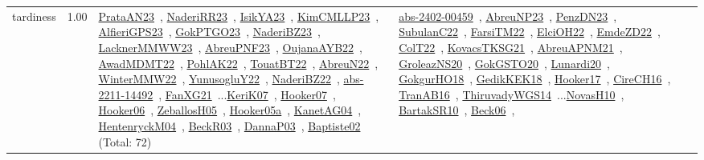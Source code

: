 {\begin{longtable}{p{3cm}r>{\raggedright\arraybackslash}p{6cm}>{\raggedright\arraybackslash}p{6cm}>{\raggedright\arraybackslash}p{8cm}}
\index{tardiness}\index{Concepts!tardiness}tardiness &  1.00 & \href{../works/PrataAN23.pdf}{PrataAN23}~\cite{PrataAN23}, \href{../works/NaderiRR23.pdf}{NaderiRR23}~\cite{NaderiRR23}, \href{../works/IsikYA23.pdf}{IsikYA23}~\cite{IsikYA23}, \href{../works/KimCMLLP23.pdf}{KimCMLLP23}~\cite{KimCMLLP23}, \href{../works/AlfieriGPS23.pdf}{AlfieriGPS23}~\cite{AlfieriGPS23}, \href{../works/GokPTGO23.pdf}{GokPTGO23}~\cite{GokPTGO23}, \href{../works/NaderiBZ23.pdf}{NaderiBZ23}~\cite{NaderiBZ23}, \href{../works/LacknerMMWW23.pdf}{LacknerMMWW23}~\cite{LacknerMMWW23}, \href{../works/AbreuPNF23.pdf}{AbreuPNF23}~\cite{AbreuPNF23}, \href{../works/OujanaAYB22.pdf}{OujanaAYB22}~\cite{OujanaAYB22}, \href{../works/AwadMDMT22.pdf}{AwadMDMT22}~\cite{AwadMDMT22}, \href{../works/PohlAK22.pdf}{PohlAK22}~\cite{PohlAK22}, \href{../works/TouatBT22.pdf}{TouatBT22}~\cite{TouatBT22}, \href{../works/AbreuN22.pdf}{AbreuN22}~\cite{AbreuN22}, \href{../works/WinterMMW22.pdf}{WinterMMW22}~\cite{WinterMMW22}, \href{../works/YunusogluY22.pdf}{YunusogluY22}~\cite{YunusogluY22}, \href{../works/NaderiBZ22.pdf}{NaderiBZ22}~\cite{NaderiBZ22}, \href{../works/abs-2211-14492.pdf}{abs-2211-14492}~\cite{abs-2211-14492}, \href{../works/FanXG21.pdf}{FanXG21}~\cite{FanXG21}...\href{../works/KeriK07.pdf}{KeriK07}~\cite{KeriK07}, \href{../works/Hooker07.pdf}{Hooker07}~\cite{Hooker07}, \href{../works/Hooker06.pdf}{Hooker06}~\cite{Hooker06}, \href{../works/ZeballosH05.pdf}{ZeballosH05}~\cite{ZeballosH05}, \href{../works/Hooker05a.pdf}{Hooker05a}~\cite{Hooker05a}, \href{../works/KanetAG04.pdf}{KanetAG04}~\cite{KanetAG04}, \href{../works/HentenryckM04.pdf}{HentenryckM04}~\cite{HentenryckM04}, \href{../works/BeckR03.pdf}{BeckR03}~\cite{BeckR03}, \href{../works/DannaP03.pdf}{DannaP03}~\cite{DannaP03}, \href{../works/Baptiste02.pdf}{Baptiste02}~\cite{Baptiste02} (Total: 72) & \href{../works/abs-2402-00459.pdf}{abs-2402-00459}~\cite{abs-2402-00459}, \href{../works/AbreuNP23.pdf}{AbreuNP23}~\cite{AbreuNP23}, \href{../works/PenzDN23.pdf}{PenzDN23}~\cite{PenzDN23}, \href{../works/SubulanC22.pdf}{SubulanC22}~\cite{SubulanC22}, \href{../works/FarsiTM22.pdf}{FarsiTM22}~\cite{FarsiTM22}, \href{../works/ElciOH22.pdf}{ElciOH22}~\cite{ElciOH22}, \href{../works/EmdeZD22.pdf}{EmdeZD22}~\cite{EmdeZD22}, \href{../works/ColT22.pdf}{ColT22}~\cite{ColT22}, \href{../works/KovacsTKSG21.pdf}{KovacsTKSG21}~\cite{KovacsTKSG21}, \href{../works/AbreuAPNM21.pdf}{AbreuAPNM21}~\cite{AbreuAPNM21}, \href{../works/GroleazNS20.pdf}{GroleazNS20}~\cite{GroleazNS20}, \href{../works/GokGSTO20.pdf}{GokGSTO20}~\cite{GokGSTO20}, \href{../works/Lunardi20.pdf}{Lunardi20}~\cite{Lunardi20}, \href{../works/GokgurHO18.pdf}{GokgurHO18}~\cite{GokgurHO18}, \href{../works/GedikKEK18.pdf}{GedikKEK18}~\cite{GedikKEK18}, \href{../works/Hooker17.pdf}{Hooker17}~\cite{Hooker17}, \href{../works/CireCH16.pdf}{CireCH16}~\cite{CireCH16}, \href{../works/TranAB16.pdf}{TranAB16}~\cite{TranAB16}, \href{../works/ThiruvadyWGS14.pdf}{ThiruvadyWGS14}~\cite{ThiruvadyWGS14}...\href{../works/NovasH10.pdf}{NovasH10}~\cite{NovasH10}, \href{../works/BartakSR10.pdf}{BartakSR10}~\cite{BartakSR10}, \href{../works/Beck06.pdf}{Beck06}~\cite{Beck06}, 
\end{longtable}}
